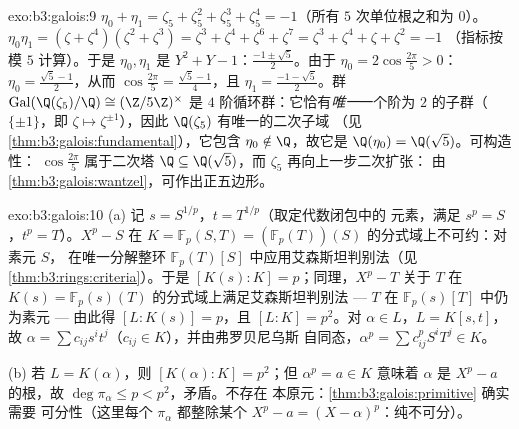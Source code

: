 \begin{solution}{exo:b3:galois:9}
$\eta_0 + \eta_1 = \zeta_5 + \zeta_5^2 + \zeta_5^3 + \zeta_5^4 =
-1$（所有 $5$ 次单位根之和为 $0$）。$\eta_0\eta_1 =
(\zeta + \zeta^4)(\zeta^2 + \zeta^3) = \zeta^3 + \zeta^4 +
\zeta^6 + \zeta^7 = \zeta^3 + \zeta^4 + \zeta + \zeta^2 = -1$
（指标按模 $5$ 计算）。于是 $\eta_0, \eta_1$ 是 $Y^2 + Y
- 1$：$\frac{-1 \pm \sqrt5}2$。由于 $\eta_0 =
2\cos\frac{2\pi}5 > 0$：$\eta_0 = \frac{\sqrt5 - 1}2$，从而
$\cos\frac{2\pi}5 = \frac{\sqrt5 - 1}4$，且 $\eta_1 =
\frac{-1-\sqrt5}2$。群
$\operatorname{Gal}(\Q(\zeta_5)/\Q) \cong (\Z/5\Z)^\times$ 是
$4$ 阶循环群：它恰有\emph{唯一}一个阶为
$2$ 的子群（$\{\pm 1\}$，即 $\zeta \mapsto \zeta^{\pm1}$），因此
$\Q(\zeta_5)$ 有唯一的二次子域
（见\cref{thm:b3:galois:fundamental}），它包含 $\eta_0
\notin \Q$，故它是 $\Q(\eta_0) = \Q(\sqrt5)$。可构造性：
$\cos\frac{2\pi}5$ 属于二次塔 $\Q \subseteq
\Q(\sqrt5)$，而 $\zeta_5$ 再向上一步二次扩张：
由\cref{thm:b3:galois:wantzel}，可作出正五边形。
\end{solution}

\begin{solution}{exo:b3:galois:10}
(a) 记 $s = S^{1/p}$，$t = T^{1/p}$（取定代数闭包中的
元素，满足 $s^p = S$，$t^p = T$）。$X^p - S$ 在
$K = \mathbb F_p(S, T) = (\mathbb
F_p(T))(S)$ 的分式域上不可约：对素元 $S$，
在唯一分解整环 $\mathbb F_p(T)[S]$ 中应用艾森斯坦判别法（见\cref{thm:b3:rings:criteria}）。于是
$[K(s):K] = p$；同理，$X^p - T$ 关于 $T$ 在
$K(s) = \mathbb F_p(s)(T)$ 的分式域上满足艾森斯坦判别法 --- $T$ 在
$\mathbb F_p(s)[T]$ 中仍为素元 --- 由此得 $[L : K(s)] = p$，且 $[L:K] =
p^2$。对 $\alpha \in L$，$L = K[s, t]$，故 $\alpha = \sum
c_{ij}s^it^j$（$c_{ij} \in K$），并由弗罗贝尼乌斯
自同态，$\alpha^p = \sum c_{ij}^p S^iT^j \in K$。

(b) 若 $L = K(\alpha)$，则 $[K(\alpha):K] = p^2$；但
$\alpha^p = a \in K$ 意味着 $\alpha$ 是 $X^p - a$ 的根，故
$\deg\pi_\alpha \leq p < p^2$，矛盾。不存在
本原元：\cref{thm:b3:galois:primitive} 确实需要
可分性（这里每个 $\pi_\alpha$ 都整除某个 $X^p - a =
(X - \alpha)^p$：纯不可分）。
\end{solution}

